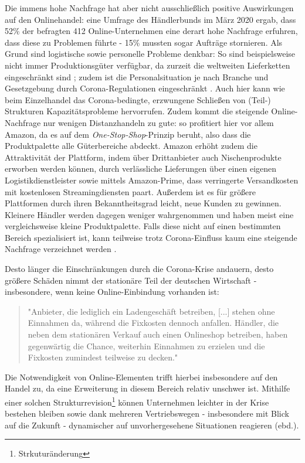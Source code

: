 \documentclass[a4paper, 12pt]{scrartcl}
\makeatletter
\newenvironment{folding}{\endgroup}{\begingroup \def \@currenvir{folding}\edef \@currenvline{\on@line}}
\makeatother
\begin{document}
\begin{folding}

Die immens hohe Nachfrage hat aber nicht ausschließlich positive Auswirkungen auf den Onlinehandel: eine Umfrage des Händlerbunds im März 2020 ergab, dass 52\% der befragten 412 Online-Unternehmen eine derart hohe Nachfrage erfuhren, dass diese zu Problemen führte - 15\% mussten sogar Aufträge stornieren. Als Grund sind logistische sowie personelle Probleme denkbar: So sind beispielsweise nicht immer Produktionsgüter verfügbar, da zurzeit die weltweiten Lieferketten eingeschränkt sind \cite{corona-wettbewerb}; zudem ist die Personalsituation je nach Branche und Gesetzgebung durch Corona-Regulationen eingeschränkt \cite{haendlerbund-studie}. Auch hier kann wie beim Einzelhandel das Corona-bedingte, erzwungene Schließen von (Teil-) Strukturen Kapazitätsprobleme hervorrufen. Zudem kommt die steigende Online-Nachfrage nur wenigen Distanzhandeln zu gute: so profitiert hier vor allem Amazon, da es auf dem \emph{One-Stop-Shop}-Prinzip beruht, also dass die Produktpalette alle Güterbereiche abdeckt. Amazon erhöht zudem die Attraktivität der Plattform, indem über Drittanbieter auch Nischenprodukte erworben werden können, durch verlässliche Lieferungen über einen eigenen Logistikdienstleister sowie mittels Amazon-Prime, dass verringerte Versandkosten mit kostenlosen Streamingdiensten paart. Außerdem ist es für größere Plattformen durch ihren Bekanntheitsgrad leicht, neue Kunden zu gewinnen. Kleinere Händler werden dagegen weniger wahrgenommen und haben meist eine vergleichsweise kleine Produktpalette. Falls diese nicht auf einen bestimmten Bereich spezialisiert ist, kann teilweise trotz Corona-Einfluss kaum eine steigende Nachfrage verzeichnet werden \cite{corona-amazon}.

Desto länger die Einschränkungen durch die Corona-Krise andauern, desto größere Schäden nimmt der stationäre Teil der deutschen Wirtschaft - insbesondere, wenn keine Online-Einbindung vorhanden ist: 
 
\begin{quote}
    "Anbieter, die lediglich ein Ladengeschäft betreiben, [...] stehen  ohne  Einnahmen  da,  während  die  Fixkosten  dennoch  anfallen.  Händler,  die  neben  dem  stationären  Verkauf  auch  einen  Onlineshop  betreiben,  haben  gegenwärtig  die  Chance,  weiterhin  Einnahmen  zu erzielen und die Fixkosten zumindest teilweise zu decken." \cite{corona-wettbewerb}
\end{quote}
Die Notwendigkeit von Online-Elementen trifft hierbei insbesondere auf den Handel zu, da eine Erweiterung in diesem Bereich relativ unschwer ist. Mithilfe einer solchen Strukturrevision\footnote{Strkuturänderung} können Unternehmen leichter in der Krise bestehen bleiben sowie dank mehreren Vertriebswegen - insbesondere mit Blick auf die Zukunft - dynamischer auf unvorhergesehene Situationen reagieren (ebd.).
 
\end{folding}
\end{document}
